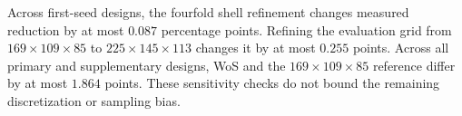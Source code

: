 Across first-seed designs, the fourfold shell refinement changes measured reduction by at most $0.087$ percentage points. Refining the evaluation grid from $169\times109\times85$ to $225\times145\times113$ changes it by at most $0.255$ points. Across all primary and supplementary designs, WoS and the $169\times109\times85$ reference differ by at most $1.864$ points. These sensitivity checks do not bound the remaining discretization or sampling bias.
